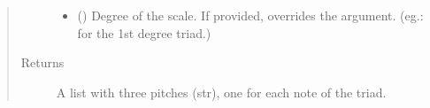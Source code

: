 \documentclass[letterpaper,10pt,english]{sphinxmanual}
\begin{document}
\begin{fulllineitems}
\begin{fulllineitems}
\begin{quote}
\begin{description}
\begin{itemize}
\item {} 
\sphinxAtStartPar
{} () \textendash{} Degree of the scale. If provided, overrides the
 argument. (eg.:  for the 1st degree triad.)

\end{itemize}

\item[{Returns}] \leavevmode
\sphinxAtStartPar
A list with three pitches (str), one for each note of the triad.

\end{description}\end{quote}

\end{fulllineitems}


\end{fulllineitems}

\end{document}
